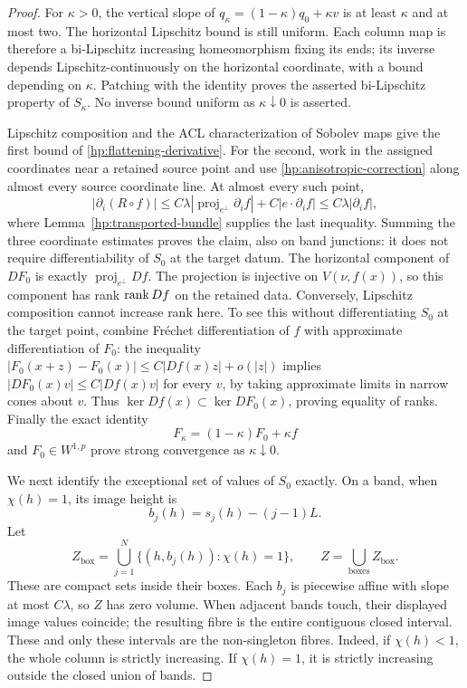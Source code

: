 \begin{proof}
For $\kappa>0$, the vertical slope of
$q_\kappa=(1-\kappa)q_0+\kappa v$ is at least $\kappa$ and at most
two.  The horizontal Lipschitz bound is still uniform.  Each column
map is therefore a bi-Lipschitz increasing homeomorphism fixing its
ends; its inverse depends Lipschitz-continuously on the horizontal
coordinate, with a bound depending on $\kappa$.  Patching with the
identity proves the asserted bi-Lipschitz property of $S_\kappa$.
No inverse bound uniform as $\kappa\downarrow0$ is asserted.

Lipschitz composition and the ACL characterization of Sobolev maps
give the first bound of \eqref{hp:flattening-derivative}.  For the
second, work in the assigned coordinates near a retained source
point and use \eqref{hp:anisotropic-correction} along almost every
source coordinate line.  At almost every such point,
\[
 |\partial_i(R\circ f)|
 \le C\lambda|\operatorname{proj}_{e^\perp}\partial_i f|
       +C|e\cdot\partial_i f|
 \le C\lambda|\partial_i f|,
\]
where Lemma~\ref{hp:transported-bundle} supplies the last inequality.
Summing the three coordinate estimates proves the claim, also on
band junctions: it does not require differentiability of $S_0$ at
the target datum.  The horizontal component of $DF_0$ is exactly
$\operatorname{proj}_{e^\perp}Df$.  The projection is injective on
$V(\nu,f(x))$, so this component has rank $\operatorname{rank} Df$ on the
retained data.  Conversely, Lipschitz composition cannot increase
rank here.  To see this without differentiating $S_0$ at the target
point, combine Fr\'echet differentiation of $f$ with approximate
differentiation of $F_0$: the inequality
$|F_0(x+z)-F_0(x)|\le C|Df(x)z|+o(|z|)$ implies
$|DF_0(x)v|\le C|Df(x)v|$ for every $v$, by taking approximate
limits in narrow cones about $v$.  Thus
$\ker Df(x)\subset\ker DF_0(x)$, proving equality of ranks.
Finally the exact identity
\[
 F_\kappa=(1-\kappa)F_0+\kappa f
\]
and $F_0\in W^{1,p}$ prove strong convergence as $\kappa\downarrow0$.

We next identify the exceptional set of values of $S_0$ exactly.
On a band, when $\chi(h)=1$, its image height is
\[
 b_j(h)=s_j(h)-(j-1)L.
\]
Let
\begin{equation}\label{hp:collapsed-values}
 Z_{\mathrm{box}}=
   \bigcup_{j=1}^N\{(h,b_j(h)):\chi(h)=1\},
 \qquad Z=\bigcup_{\mathrm{boxes}}Z_{\mathrm{box}}.
\end{equation}
These are compact sets inside their boxes.  Each $b_j$ is piecewise
affine with slope at most $C\lambda$, so $Z$ has zero volume.
When adjacent bands touch, their displayed image values coincide;
the resulting fibre is the entire contiguous closed interval.
These and only these intervals are the non-singleton fibres.  Indeed,
if $\chi(h)<1$, the whole column is strictly increasing.  If
$\chi(h)=1$, it is strictly increasing outside the closed union of
bands.


\end{proof}
